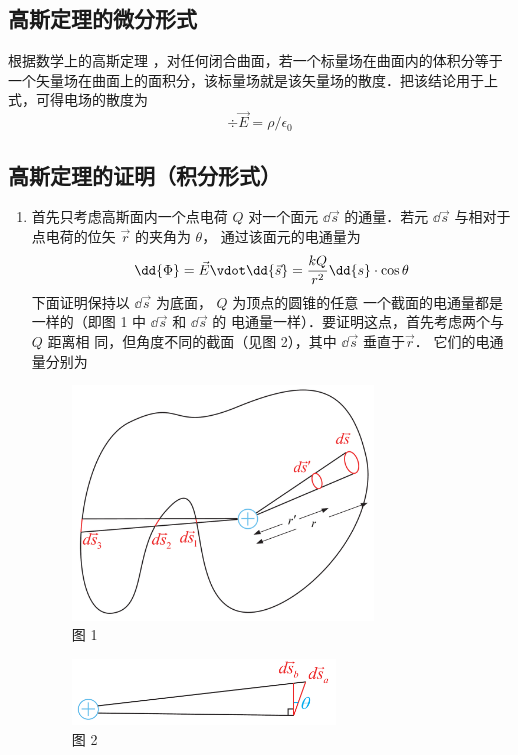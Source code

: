 \subsection{高斯定理的微分形式}

根据数学上的高斯定理%
，对任何闭合曲面，若一个标量场在曲面内的体积分等于一个矢量场在曲面上的面积分，该标量场就是该矢量场的散度．把该结论用于上式，可得电场的散度为
\begin{equation}
\div \vec E = \rho / \epsilon_0
\end{equation} 


\subsection{高斯定理的证明（积分形式）}
\begin{enumerate}
\item 首先只考虑高斯面内一个点电荷 $Q$ 对一个面元 $\dd{\vec s}$ 的通量．若元 $\dd{\vec s}$ 与相对于点电荷的位矢 $\vec r$ 的夹角为 $\theta$， 通过该面元的电通量为
\begin{equation}
\dd{\Phi} = \vec E \vdot \dd{\vec s} = \frac{kQ}{r^2} \dd{s} \cdot \cos \theta 
\end{equation} 
下面证明保持以 $\dd{\vec s}$ 为底面， $Q$ 为顶点的圆锥的任意
一个截面的电通量都是一样的（即图 1 中 $\dd{\vec s}$ 和 $\dd{\vec s}$ 的
电通量一样）．要证明这点，首先考虑两个与 $Q$ 距离相
同，但角度不同的截面（见图 2），其中 $\dd{\vec s}$ 垂直于$\vec r$． 它们的电通量分别为
\begin{figure}[ht]
\centering
\includegraphics[width=8cm]{./figures/EGauss1.pdf}
\caption{图 1}
\end{figure}
\begin{figure}[ht]
\centering
\includegraphics[width=7cm]{./figures/EGauss2.pdf}
\caption{图 2}
\end{figure}


\end{enumerate}
